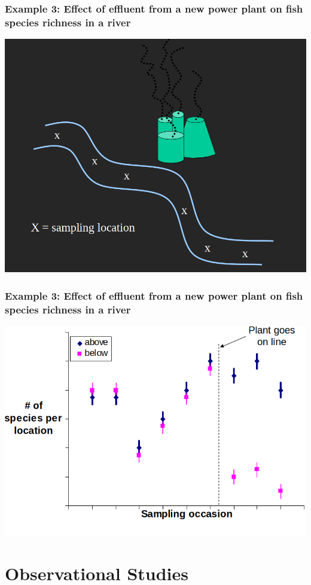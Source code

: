 \documentclass[color=usenames,dvipsnames]{beamer}\usepackage[]{graphicx}\usepackage[]{color}
\begin{document}
\begin{frame}
  \frametitle{Example 3: Effect of effluent from a new power plant on
    fish species richness in a river}
  \centering
  \includegraphics[width=\textwidth]{power-plant-river} \\
\end{frame}


\begin{frame}
  \frametitle{Example 3: Effect of effluent from a new power plant on
    fish species richness in a river}
  \centering
  \includegraphics[width=\textwidth]{power-plant} \\
\end{frame}


\section{Observational Studies}
\end{document}
